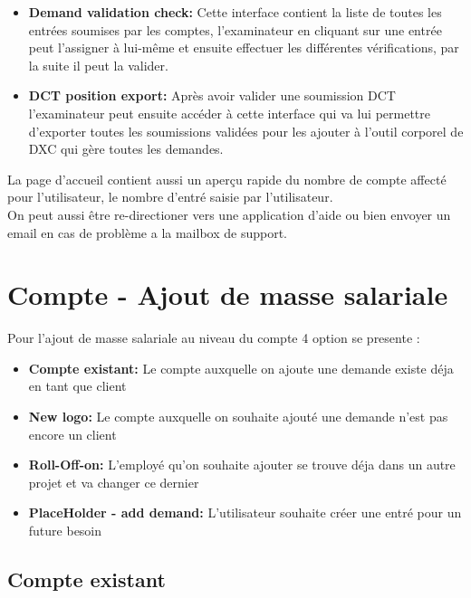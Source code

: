\begin{itemize}
\begin{itemize}
             \begin{itemize}
                        \item[\ding{51}] \textbf{Demand validation check:} Cette interface contient la liste de toutes les entrées soumises par les comptes, l'examinateur en cliquant sur une entrée peut l'assigner à lui-même et ensuite effectuer les différentes vérifications, par la suite il peut la valider.
                        \item[\ding{51}] \textbf{DCT position export:} Après avoir valider une soumission DCT l'examinateur peut ensuite accéder à cette interface qui va lui permettre d'exporter toutes les soumissions validées pour les ajouter à l'outil corporel de DXC qui gère toutes les demandes.
                \end{itemize}
            
        \end{itemize}
    
\end{itemize}

La page d'accueil contient aussi un aperçu rapide du nombre de compte affecté pour l'utilisateur, le nombre d'entré saisie par l'utilisateur.
\\[0.3cm]
On peut aussi être re-directioner vers une application d'aide ou bien envoyer un email en cas de problème a la mailbox de support. 

\newpage
\section{Compte - Ajout de masse salariale}
Pour l'ajout de masse salariale au niveau du compte 4 option se presente :

\begin{itemize}
    \item \textbf{Compte existant:} Le compte auxquelle on ajoute une demande existe déja en tant que client
    \item \textbf{New logo:}  Le compte auxquelle on souhaite ajouté une demande n'est pas encore un client
    \item \textbf{Roll-Off\Roll-on:} L'employé qu'on souhaite ajouter se trouve déja dans un autre projet et va changer ce dernier
    \item \textbf{PlaceHolder - add demand:} L'utilisateur souhaite créer une entré pour un future besoin
\end{itemize}

\subsection{Compte existant}

